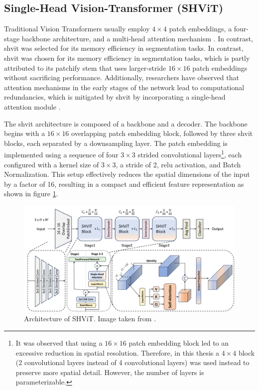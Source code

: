 \subsection{Single-Head Vision-Transformer (SHViT)} \label{sec_architecture_shvit}
Traditional Vision Transformers usually employ $4 \times 4$ patch embeddings, a four-stage backbone architecture, and a multi-head attention mechanism \cite{liu2022convnet2020s, li2022efficientformervisiontransformersmobilenet, vasu2023fastvitfasthybridvision}. In contrast, \gls{shvit} was selected for its memory efficiency in segmentation tasks. In contrast, \gls{shvit} was chosen for its memory efficiency in segmentation tasks, which is partly attributed to its patchify stem that uses larger-stride $16 \times 16$ patch embeddings without sacrificing performance. Additionally, researchers have observed that attention mechanisms in the early stages of the network lead to computational redundancies, which is mitigated by \gls{shvit} by incorporating a single-head attention module \cite{yun2024shvit}.

\medskip 

The \gls{shvit} architecture is composed of a backbone and a decoder. The backbone begins with a $16 \times 16$ overlapping patch embedding block, followed by three \gls{shvit} blocks, each separated by a downsampling layer. The patch embedding is implemented using a sequence of four $3 \times 3$ strided convolutional layers\footnote{It was observed that using a $16 \times 16$ patch embedding block led to an excessive reduction in spatial resolution. Therefore, in this thesis a $4 \times 4$ block (2 convolutional layers instead of 4 convolutional layers) was used instead to preserve more spatial detail. However, the number of layers is parameterizable.}, each configured with a kernel size of $3 \times 3$, a stride of 2, \gls{relu} activation, and Batch Normalization. This setup effectively reduces the spatial dimensions of the input by a factor of 16, resulting in a compact and efficient feature representation as shown in figure \ref{Architecture_of_SHViT}.

\begin{figure}[H]
	\centering
	\includegraphics[width=1.0\textwidth]{./images/SHViT_architecture.pdf}
	\caption[Architecture of SHViT]{Architecture of SHViT. Image taken from \cite{yun2024shvit}.}
	\label{Architecture_of_SHViT}
\end{figure}

